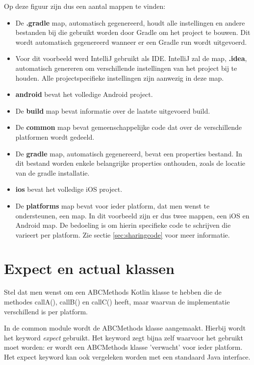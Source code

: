 Op deze figuur zijn dus een aantal mappen te vinden:
\begin{itemize}
	\item De \textbf{.gradle} map, automatisch gegenereerd, houdt alle instellingen en andere bestanden bij die gebruikt worden door Gradle om het project te bouwen. Dit wordt automatisch gegenereerd wanneer er een Gradle run wordt uitgevoerd.
	\item Voor dit voorbeeld werd IntelliJ gebruikt als IDE. IntelliJ zal de map, \textbf{.idea}, automatisch genereren om verschillende instellingen van het project bij te houden. Alle projectspecifieke instellingen zijn aanwezig in deze map.
	\item \textbf{android} bevat het volledige Android project.
	\item De \textbf{build} map bevat informatie over de laatste uitgevoerd build.
	\item De \textbf{common} map bevat gemeenschappelijke code dat over de verschillende platformen wordt gedeeld.
	\item De \textbf{gradle} map, automatisch gegenereerd, bevat een properties bestand. In dit bestand worden enkele belangrijke properties onthouden, zoals de locatie van de gradle installatie.
	\item \textbf{ios} bevat het volledige iOS project.
	\item De \textbf{platforms} map bevat voor ieder platform, dat men wenst te ondersteunen, een map. In dit voorbeeld zijn er dus twee mappen, een iOS en Android map. De bedoeling is om hierin specifieke code te schrijven die varieert per platform. Zie sectie \ref{sec:sharingcode} voor meer informatie.
\end{itemize}

\section {Expect en actual klassen}
\label{sec:expectandactual}
Stel dat men wenst om een ABCMethods Kotlin klasse te hebben die de methodes callA(), callB() en callC() heeft, maar waarvan de implementatie verschillend is per platform.

In de common module wordt de ABCMethods klasse aangemaakt. Hierbij wordt het keyword \textit{expect} gebruikt. Het keyword zegt bijna zelf waarvoor het gebruikt moet worden: er wordt een ABCMethods klasse 'verwacht' voor ieder platform. Het expect keyword kan ook vergeleken worden met een standaard Java interface.

